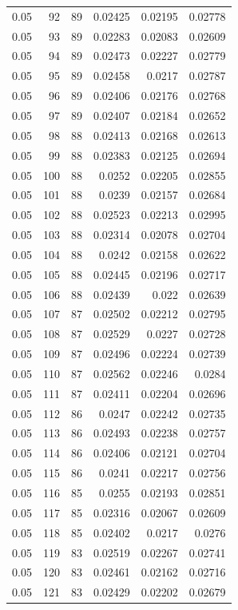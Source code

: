 \begin{tabular}{rrrrrr}
0.05 & 92 & 89 & 0.02425 & 0.02195 & 0.02778 \\
0.05 & 93 & 89 & 0.02283 & 0.02083 & 0.02609 \\
0.05 & 94 & 89 & 0.02473 & 0.02227 & 0.02779 \\
0.05 & 95 & 89 & 0.02458 & 0.0217 & 0.02787 \\
0.05 & 96 & 89 & 0.02406 & 0.02176 & 0.02768 \\
0.05 & 97 & 89 & 0.02407 & 0.02184 & 0.02652 \\
0.05 & 98 & 88 & 0.02413 & 0.02168 & 0.02613 \\
0.05 & 99 & 88 & 0.02383 & 0.02125 & 0.02694 \\
0.05 & 100 & 88 & 0.0252 & 0.02205 & 0.02855 \\
0.05 & 101 & 88 & 0.0239 & 0.02157 & 0.02684 \\
0.05 & 102 & 88 & 0.02523 & 0.02213 & 0.02995 \\
0.05 & 103 & 88 & 0.02314 & 0.02078 & 0.02704 \\
0.05 & 104 & 88 & 0.0242 & 0.02158 & 0.02622 \\
0.05 & 105 & 88 & 0.02445 & 0.02196 & 0.02717 \\
0.05 & 106 & 88 & 0.02439 & 0.022 & 0.02639 \\
0.05 & 107 & 87 & 0.02502 & 0.02212 & 0.02795 \\
0.05 & 108 & 87 & 0.02529 & 0.0227 & 0.02728 \\
0.05 & 109 & 87 & 0.02496 & 0.02224 & 0.02739 \\
0.05 & 110 & 87 & 0.02562 & 0.02246 & 0.0284 \\
0.05 & 111 & 87 & 0.02411 & 0.02204 & 0.02696 \\
0.05 & 112 & 86 & 0.0247 & 0.02242 & 0.02735 \\
0.05 & 113 & 86 & 0.02493 & 0.02238 & 0.02757 \\
0.05 & 114 & 86 & 0.02406 & 0.02121 & 0.02704 \\
0.05 & 115 & 86 & 0.0241 & 0.02217 & 0.02756 \\
0.05 & 116 & 85 & 0.0255 & 0.02193 & 0.02851 \\
0.05 & 117 & 85 & 0.02316 & 0.02067 & 0.02609 \\
0.05 & 118 & 85 & 0.02402 & 0.0217 & 0.0276 \\
0.05 & 119 & 83 & 0.02519 & 0.02267 & 0.02741 \\
0.05 & 120 & 83 & 0.02461 & 0.02162 & 0.02716 \\
0.05 & 121 & 83 & 0.02429 & 0.02202 & 0.02679 \\

\end{tabular}
